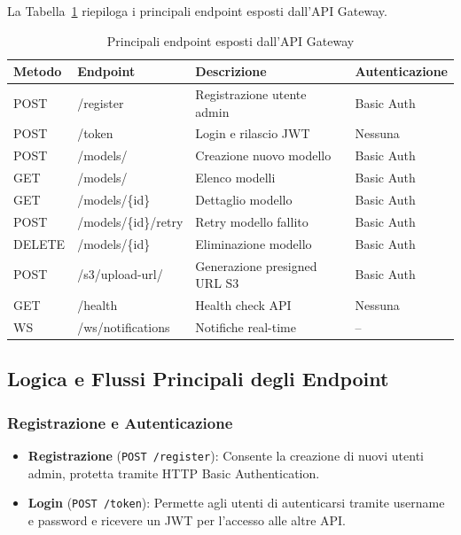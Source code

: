 La Tabella~\ref{tab:endpoint_bff} riepiloga i principali endpoint esposti dall'API Gateway.

\begin{table}[H]
	\centering
	\begin{tabular}{|l|l|l|l|}
		\hline
		Metodo & Endpoint & Descrizione & Autenticazione \\
		\hline
		POST & /register & Registrazione utente admin & Basic Auth \\
		POST & /token & Login e rilascio JWT & Nessuna \\
		POST & /models/ & Creazione nuovo modello & Basic Auth \\
		GET & /models/ & Elenco modelli & Basic Auth \\
		GET & /models/\{id\} & Dettaglio modello & Basic Auth \\
		POST & /models/\{id\}/retry & Retry modello fallito & Basic Auth \\
		DELETE & /models/\{id\} & Eliminazione modello & Basic Auth \\
		POST & /s3/upload-url/ & Generazione presigned URL S3 & Basic Auth \\
		GET & /health & Health check API & Nessuna \\
		WS & /ws/notifications & Notifiche real-time & -- \\
		\hline
	\end{tabular}
	\caption{Principali endpoint esposti dall’API Gateway}
	\label{tab:endpoint_bff}
\end{table}

\subsection{Logica e Flussi Principali degli Endpoint}

\subsubsection{Registrazione e Autenticazione}

\begin{itemize}
	\item \textbf{Registrazione} (\texttt{POST /register}): Consente la creazione di nuovi utenti admin, protetta tramite HTTP Basic Authentication.
	\item \textbf{Login} (\texttt{POST /token}): Permette agli utenti di autenticarsi tramite username e password e ricevere un JWT per l’accesso alle altre API.
\end{itemize}

